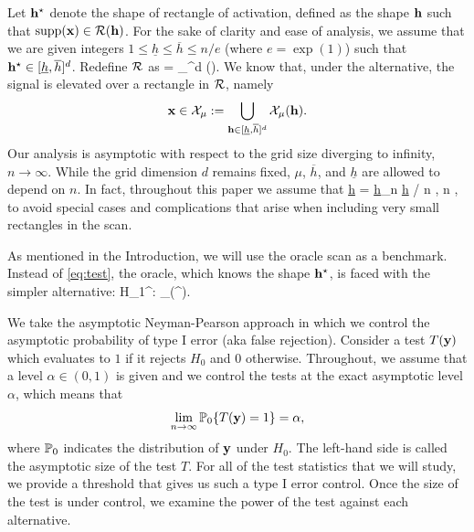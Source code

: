 \documentclass[twoside,11pt]{article}
\begin{document}
%
Let $\mathbf{h}^\star$ denote the shape of rectangle of activation, defined as the shape $\mathbf{h}$ such that ${\rm supp}(\mathbf{x}) \in \mathcal{R}(\mathbf{h})$.
For the sake of clarity and ease of analysis, we assume that we are given integers $1 \le \underline h \le \overline h \le n/e$ (where $e = \exp(1)$) such that $\mathbf{h}^\star \in [\underline h, \overline h]^d$.  
Redefine $\mathcal{R}$ as 
\beq \label{Rcal}
\Rcal = \bigcup_{\hb {}^d} \Rcal(\hb).
\eeq
We know that, under the alternative, the signal is elevated over a rectangle in $\mathcal{R}$, namely
\[
\mathbf{x} \in \mathcal{X}_\mu := \bigcup_{\mathbf{h} \in [\underline h, \overline h]^d} \mathcal{X}_\mu(\mathbf{h}).
\]
Our analysis is asymptotic with respect to the grid size diverging to infinity, $n \to \infty$.  While the grid dimension $d$ remains fixed, $\mu$, $\overline h$, and $\underline h$ are allowed to depend on $n$.  In fact, throughout this paper we assume that 
\beq \label{underline_h}
\underline h = \underline h_n  \underline h / \log n \rightarrow \infty,  n \to \infty,
\eeq
to avoid special cases and complications that arise when including very small rectangles in the scan.  

As mentioned in the Introduction, we will use the oracle scan as a benchmark.  Instead of \eqref{eq:test}, the oracle, which knows the shape $\mathbf{h}^\star$, is faced with the simpler alternative:
\beq \label{oracle}
H_1^\star: \xb \in \Xcal_\mu(\hb^\star).
\eeq

We take the asymptotic Neyman-Pearson approach in which we control the asymptotic probability of type I error (aka false rejection).
Consider a test $T(\mathbf{y})$ which evaluates to $1$ if it rejects $H_0$ and $0$ otherwise.
Throughout, we assume that a level $\alpha \in (0,1)$ is given and we control the tests at the exact asymptotic level $\alpha$, which means that
\[
\lim_{n \rightarrow \infty} \mathbb{P}_0 \{ T(\mathbf{y}) = 1 \} = \alpha,
\]
where $\mathbb{P}_0$ indicates the distribution of $\mathbf{y}$ under $H_0$.
The left-hand side is called the asymptotic size of the test $T$.
For all of the test statistics that we will study, we provide a threshold that gives us such a type I error control.
Once the size of the test is under control, we examine the power of the test against each alternative.  
\end{document}
